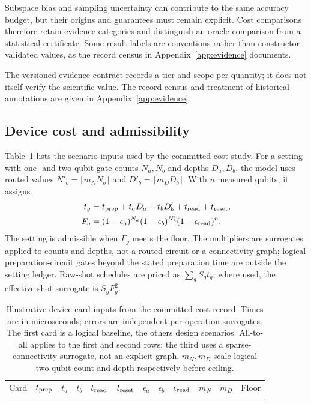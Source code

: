 \documentclass[aps,pra,reprint,superscriptaddress,nofootinbib,floatfix,
  showkeys]{revtex4-2}
\newcommand{\compactcolumns}{\setlength{\tabcolsep}{2.5pt}}
\begin{document}
Subspace bias and sampling uncertainty can contribute to the same accuracy
budget, but their origins and guarantees must remain explicit. Cost comparisons
therefore retain evidence categories and distinguish an oracle comparison from
a statistical certificate. Some result labels are conventions rather than
constructor-validated values, as the record census in Appendix~\ref{app:evidence} documents.

The versioned evidence contract records a tier and scope per quantity;
it does not itself verify the scientific value. The record census and treatment
of historical annotations are given in Appendix~\ref{app:evidence}.

\subsection{Device cost and admissibility}

Table~\ref{tab:device-cards} lists the scenario inputs used by the committed
cost study. For a setting with one- and two-qubit gate counts $N_a,N_b$ and depths
$D_a,D_b$, the model uses routed values $N'_b=\lceil m_N N_b\rceil$ and
$D'_b=\lceil m_D D_b\rceil$. With $n$ measured qubits, it assigns
\begin{align}
 t_g &= t_{\rm prep}+t_aD_a+t_bD'_b+t_{\rm read}+t_{\rm reset},\\
 F_g &= (1-\epsilon_a)^{N_a}(1-\epsilon_b)^{N'_b}
       (1-\epsilon_{\rm read})^n.
 \label{eq:device-model}
\end{align}
The setting is admissible when $F_g$ meets the floor. The multipliers are
surrogates applied to counts and depths, not a routed circuit or a connectivity
graph; logical preparation-circuit gates beyond the stated preparation time
are outside the setting ledger. Raw-shot schedules are priced as
$\sum_g S_g t_g$; where used, the effective-shot surrogate is $S_gF_g^2$.

\begin{table}
  \caption{Illustrative device-card inputs from the committed cost record.
  Times are in microseconds; errors are independent per-operation surrogates.
  The first card is a logical baseline, the others design scenarios. All-to-all
  applies to the first and second rows; the third uses a sparse-connectivity
  surrogate, not an explicit graph. $m_N,m_D$ scale logical two-qubit count and
  depth respectively before ceiling.}
  \label{tab:device-cards}
  \scriptsize
  \compactcolumns
  \begin{ruledtabular}
  \begin{tabular}{lrrrrrrrrrrr}
  Card & $t_{\rm prep}$ & $t_a$ & $t_b$ & $t_{\rm read}$ & $t_{\rm reset}$ & $\epsilon_a$ & $\epsilon_b$ & $\epsilon_{\rm read}$ & $m_N$ & $m_D$ & Floor \\
  \colrule
  
  \end{tabular}
  \end{ruledtabular}
\end{table}
\end{document}

